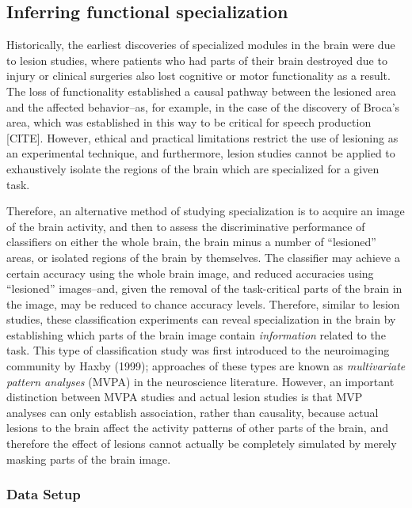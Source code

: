 \subsection{Inferring functional specialization}

Historically, the earliest discoveries
of specialized modules in the brain were due to lesion studies, where
patients who had parts of their brain destroyed due to injury or
clinical surgeries also lost cognitive or motor functionality as a
result.  The loss of functionality established a causal pathway
between the lesioned area and the affected behavior--as, for example,
in the case of the discovery of Broca's area, which was established in
this way to be critical for speech production [CITE].  However,
ethical and practical limitations restrict the use of lesioning as an
experimental technique, and furthermore, lesion studies cannot be
applied to exhaustively isolate the regions of the brain which are
specialized for a given task.

Therefore, an alternative method of studying specialization is to
acquire an image of the brain activity, and then to assess the
discriminative performance of classifiers on either the whole brain,
the brain minus a number of ``lesioned'' areas, or isolated regions of
the brain by themselves.  The classifier may achieve a certain
accuracy using the whole brain image, and reduced accuracies using
``lesioned'' images--and, given the removal of the task-critical parts
of the brain in the image, may be reduced to chance accuracy levels.
Therefore, similar to lesion studies, these classification experiments
can reveal specialization in the brain by establishing which parts of
the brain image contain \emph{information} related to the task.  This
type of classification study was first introduced to the neuroimaging
community by Haxby (1999); approaches of these types are known as
\emph{multivariate pattern analyses} (MVPA) in the neuroscience
literature. However, an important distinction between MVPA studies and
actual lesion studies is that MVP analyses can only establish
association, rather than causality, because actual lesions to the
brain affect the activity patterns of other parts of the brain, and
therefore the effect of lesions cannot actually be completely
simulated by merely masking parts of the brain image.

\subsubsection{Data Setup}

